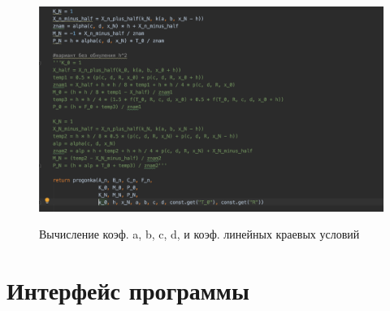 \documentclass[a4paper,12pt]{article}
\begin{document}
	\begin{figure}[h!]
		\begin{center}
			{\includegraphics[scale = 0.6]{task3.png}}
		\end{center}
		\caption{Вычисление коэф. a, b, c, d, и коэф. линейных краевых условий}
		\label{task3}
	\end{figure}

	\section*{Интерфейс программы}
	
\end{document}
